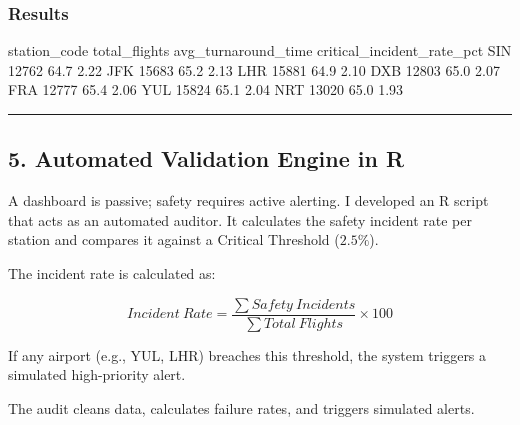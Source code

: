 \documentclass[
  letterpaper,
  DIV=11,
  numbers=noendperiod]{scrartcl}
\begin{document}
\subsubsection{Results}

station\_code total\_flights avg\_turnaround\_time
critical\_incident\_rate\_pct SIN 12762 64.7 2.22 JFK 15683 65.2 2.13
LHR 15881 64.9 2.10 DXB 12803 65.0 2.07 FRA 12777 65.4 2.06 YUL 15824
65.1 2.04 NRT 13020 65.0 1.93

\begin{center}\rule{0.5\linewidth}{0.5pt}\end{center}

\subsection{5. Automated Validation Engine in
R}\label{automated-validation-engine-in-r}

A dashboard is passive; safety requires active alerting. I developed an
R script that acts as an automated auditor. It calculates the safety
incident rate per station and compares it against a Critical Threshold
(\(2.5\%\)).

The incident rate is calculated as:

\[Incident\ Rate = \frac{\sum Safety\ Incidents}{\sum Total\ Flights} \times 100\]

If any airport (e.g., YUL, LHR) breaches this threshold, the system
triggers a simulated high-priority alert.

The audit cleans data, calculates failure rates, and triggers simulated
alerts.
\end{document}
